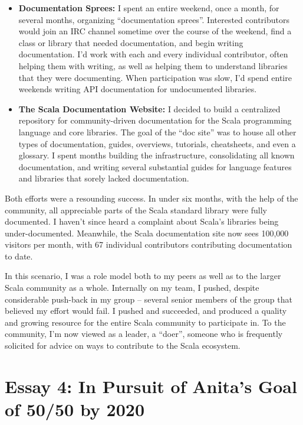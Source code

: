 \documentclass[acmtocl]{acmtrans2m}
\begin{document}
\vspace{-0.1in}
\begin{itemize}
\item \textbf{\textsf{Documentation Sprees:}} I spent an entire weekend, once a month, for several months, organizing ``documentation sprees''. Interested contributors would join an IRC channel sometime over the course of the weekend, find a class or library that needed documentation, and begin writing documentation. I'd work with each and every individual contributor, often helping them with writing, as well as helping them to understand libraries that they were documenting. When participation was slow, I'd spend entire weekends writing API documentation for undocumented libraries.

\item \textbf{\textsf{The Scala Documentation Website:}} I decided to build a centralized repository for community-driven documentation for the Scala programming language and core libraries. The goal of the ``doc site'' was to house all other types of documentation, guides, overviews, tutorials, cheatsheets, and even a glossary. I spent months building the infrastructure, consolidating all known documentation, and writing several substantial guides for language features and libraries that sorely lacked documentation.
\end{itemize}
\vspace{-0.1in}

Both efforts were a resounding success. In under six months, with the help of
the community, all appreciable parts of the Scala standard library were fully
documented. I haven't since heard a complaint about Scala's libraries being
under-documented. Meanwhile, the Scala documentation site now sees 100,000
visitors per month, with 67 individual contributors contributing
documentation to date.

In this scenario, I was a role model both to my peers as well as to the larger
Scala community as a whole. Internally on my team, I pushed, despite
considerable push-back in my group -- several senior members of the group that
believed my effort would fail. I pushed and succeeded, and produced a quality
and growing resource for the entire Scala community to participate in. To the
community, I'm now viewed as a leader, a ``doer'', someone who is frequently
solicited for advice on ways to contribute to the Scala ecosystem.


\section*{\textbf{Essay 4:} In Pursuit of Anita's Goal of 50/50 by 2020}
\end{document}

